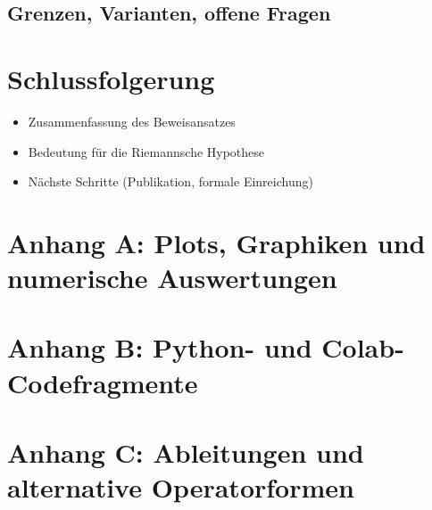\documentclass[12pt]{article}
\begin{document}
\subsection{Grenzen, Varianten, offene Fragen}

\section{Schlussfolgerung}
\begin{itemize}
  \item Zusammenfassung des Beweisansatzes
  \item Bedeutung für die Riemannsche Hypothese
  \item Nächste Schritte (Publikation, formale Einreichung)
\end{itemize}

\appendix
\section{Anhang A: Plots, Graphiken und numerische Auswertungen}
\section{Anhang B: Python- und Colab-Codefragmente}
\section{Anhang C: Ableitungen und alternative Operatorformen}
\end{document}
